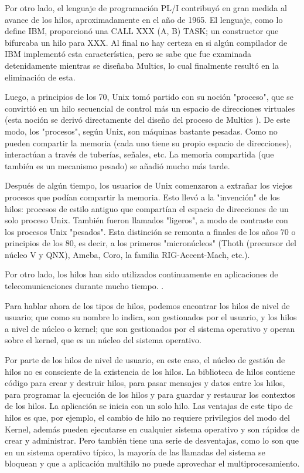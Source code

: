 \documentclass[12pt]{article}
\begin{document}
{Por otro lado, el lenguaje de programación PL/I contribuyó en gran medida al avance de los hilos, aproximadamente en el año de 1965. El lenguaje, como lo define IBM, proporcionó una CALL XXX (A, B) TASK; un constructor que bifurcaba un hilo para XXX. Al final no hay certeza en si algún compilador de IBM implementó esta característica, pero se sabe que fue examinada detenidamente mientras se diseñaba Multics, lo cual finalmente resultó en la eliminación de esta.
\newline

Luego, a principios de los 70, Unix tomó partido con su noción "proceso", que se convirtió en un hilo secuencial de control más un espacio de direcciones virtuales (esta noción se derivó directamente del diseño del proceso de Multics ). De este modo, los "procesos", según Unix, son máquinas bastante pesadas. Como no pueden compartir la memoria (cada uno tiene su propio espacio de direcciones), interactúan a través de tuberías, señales, etc. La memoria compartida (que también es un mecanismo pesado) se añadió mucho más tarde.
\newline

Después de algún tiempo, los usuarios de Unix comenzaron a extrañar los viejos procesos que podían compartir la memoria. Esto llevó a la "invención" de los hilos: procesos de estilo antiguo que compartían el espacio de direcciones de un solo proceso Unix. También fueron llamados "ligeros", a modo de contraste con los procesos Unix "pesados". Esta distinción se remonta a finales de los años 70 o principios de los 80, es decir, a los primeros "micronúcleos" (Thoth (precursor del núcleo V y QNX), Ameba, Coro, la familia RIG-Accent-Mach, etc.).
\newline

Por otro lado, los hilos han sido utilizados continuamente en aplicaciones de telecomunicaciones durante mucho tiempo.
\citep{Tip}.
\newline

Para hablar ahora de los tipos de hilos, podemos encontrar los hilos de nivel de usuario; que como su nombre lo indica, son gestionados por el usuario, y los hilos a nivel de núcleo o kernel; que son gestionados por el sistema operativo y operan sobre el kernel, que es un núcleo del sistema operativo.
\newline

Por parte de los hilos de nivel de usuario, en este caso, el núcleo de gestión de hilos no es consciente de la existencia de los hilos. La biblioteca de hilos contiene código para crear y destruir hilos, para pasar mensajes y datos entre los hilos, para programar la ejecución de los hilos y para guardar y restaurar los contextos de los hilos. La aplicación se inicia con un solo hilo. Las ventajas de este tipo de hilos es que, por ejemplo, el cambio de hilo no requiere privilegios del modo del Kernel, además pueden ejecutarse en cualquier sistema operativo y son rápidos de crear y administrar. Pero también tiene una serie de desventajas, como lo son que en un sistema operativo típico, la mayoría de las llamadas del sistema se bloquean y que a aplicación multihilo no puede aprovechar el multiprocesamiento.
\newline

}
\end{document}
